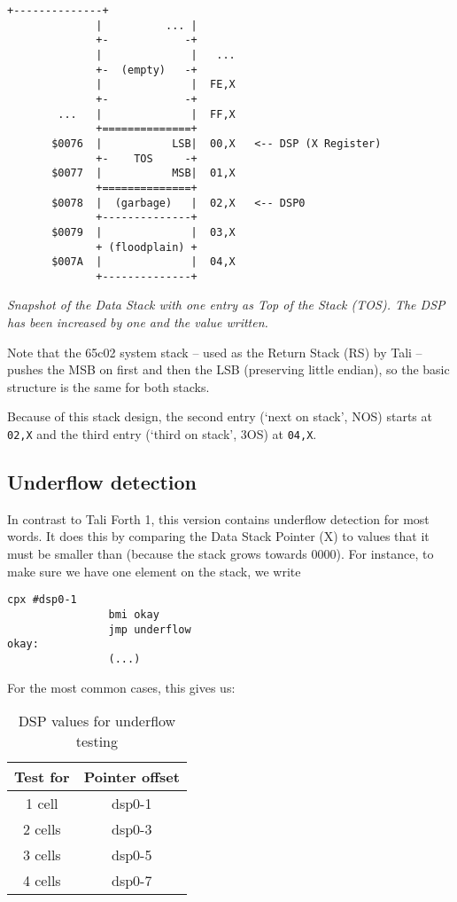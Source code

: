 \begin{lstlisting}[frame=single]
              +--------------+           
              |          ... |  
              +-            -+ 
              |              |   ...
              +-  (empty)   -+
              |              |  FE,X
              +-            -+ 
        ...   |              |  FF,X
              +==============+  
       $0076  |           LSB|  00,X   <-- DSP (X Register)
              +-    TOS     -+ 
       $0077  |           MSB|  01,X
              +==============+ 
       $0078  |  (garbage)   |  02,X   <-- DSP0 
              +--------------+           
       $0079  |              |  03,X
              + (floodplain) + 
       $007A  |              |  04,X
              +--------------+           
\end{lstlisting}

\textit{Snapshot of the Data Stack with one entry as Top of the Stack (TOS). The
DSP has been increased by one and the value written.}

Note that the 65c02 system stack -- used as the Return Stack (RS) by Tali --
pushes the MSB on first and then the LSB (preserving little endian), so the
basic structure is the same for both stacks. 

Because of this stack design, the second entry (`next on stack', NOS) starts at
\texttt{02,X} and the third entry (`third on stack', 3OS) at \texttt{04,X}. 

\subsection{Underflow detection} In contrast to Tali
Forth 1, this version contains underflow detection for most
words. It does this by comparing the Data Stack Pointer (X) to
values that it must be smaller than (because the stack grows towards 0000). For
instance, to make sure we have one element on the stack, we write

\begin{lstlisting}[frame=lines]
                cpx #dsp0-1
                bmi okay
                jmp underflow
okay:
                (...)
\end{lstlisting}

\noindent For the most common cases, this gives us:

\begin{table}[h!]
\centering
\begin{tabular}{ | c | c | }
        \hline
        Test for &  Pointer offset\\
        \hline
        1 cell   &  dsp0-1\\
        2 cells  &  dsp0-3\\
        3 cells  &  dsp0-5\\
        4 cells  &  dsp0-7\\
        \hline
\end{tabular}
        \caption{DSP values for underflow testing}
        \label{table_uf}
\end{table}

